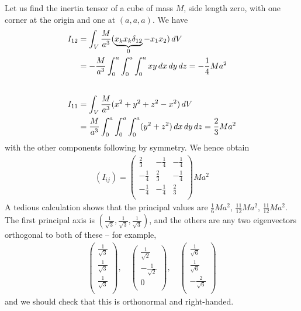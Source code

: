 \documentclass{../../template/note}
\begin{document}
    \begin{example*}[hard]
        Let us find the inertia tensor of a cube of mass \(M\), side length zero, with one corner at the origin and one at \((a, a, a)\). We have
        \begin{align*}
            I_{12} &= \int_V \frac{M}{a^3} (\underbrace{x_kx_k\delta_{12}}_0-x_1x_2) \,d{V} \\
            &= -\frac{M}{a^3} \int_0^a \int_0^a \int_0^a xy \,d{x} \,d{y} \,d{z} = -\frac 1 4 Ma^2 \\[20pt]            
            I_{11} &= \int_V \frac{M}{a^3} (x^2+y^2+z^2-x^2) \,d{V} \\
            &= \frac{M}{a^3} \int_0^a \int_0^a \int_0^a (y^2+z^2) \,d{x} \,d{y} \,d{z} = \frac 2 3 Ma^2
        \end{align*}
        with the other components following by symmetry. We hence obtain
        \begin{align*}
            (I_{ij}) = \begin{pmatrix}
                \frac 2 3 & -\frac 1 4 & -\frac 1 4 \\
                -\frac 1 4 & \frac 2 3 & -\frac 1 4 \\
                -\frac 1 4 & -\frac 1 4 & \frac 2 3 \\
            \end{pmatrix}Ma^2
        \end{align*}
        A tedious calculation shows that the principal values are \(\frac 1 6 Ma^2\), \(\frac {11}{12} Ma^2\), \(\frac {11}{12} Ma^2\). The first principal axis is \(\left(\frac 1 {\sqrt 3}, \frac 1 {\sqrt 3}, \frac 1 {\sqrt 3}\right)\), and the others are any two eigenvectors orthogonal to both of these -- for example,
        \begin{align*}
            \begin{pmatrix}
                \frac 1 {\sqrt 3} \\
                \frac 1 {\sqrt 3} \\
                \frac 1 {\sqrt 3} \\
            \end{pmatrix}, \quad \begin{pmatrix}
                \frac 1 {\sqrt 2} \\
                -\frac 1 {\sqrt 2} \\
                0 \\
            \end{pmatrix}, \quad \begin{pmatrix}
                \frac 1 {\sqrt 6} \\
                \frac 1 {\sqrt 6} \\
                -\frac 2 {\sqrt 6} \\
            \end{pmatrix}
        \end{align*}
        and we should check that this is orthonormal and right-handed.


\end{example*}
\end{document}
